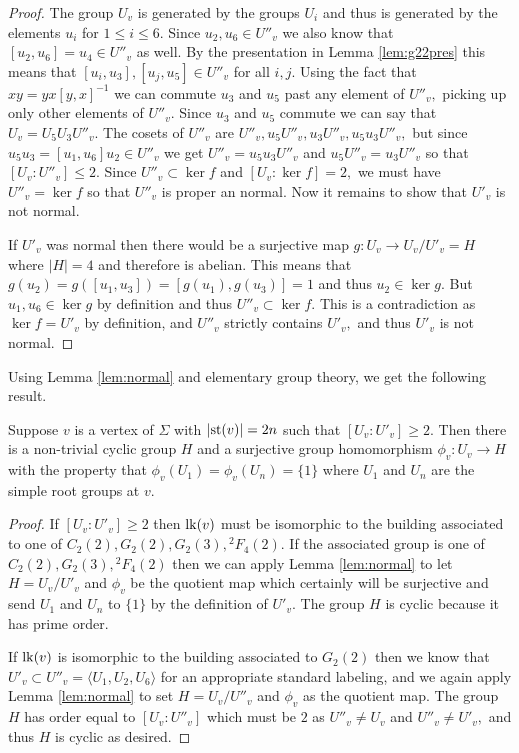 \documentclass[class=book, crop=false,12 pt]{standalone}
\begin{document}
\begin{proof}
	The group $U_v$ is generated by the groups $U_i$ and thus is generated by the elements $u_i$ for $1\le i \le 6.$ Since $u_2,u_6\in U''_v$ we also know that $[u_2,u_6]=u_4\in U''_v$ as well. By the presentation in Lemma \ref{lem:g22pres} this means that $[u_i,u_3],[u_j,u_5]\in U''_v$ for all $i,j.$ Using the fact that $xy=yx[y,x]^{-1}$ we can commute $u_3$ and $u_5$ past any element of $U''_v,$ picking up only other elements of $U''_v.$ Since $u_3$ and $u_5$ commute we can say that $U_v=U_5U_3U''_v.$ The cosets of $U''_v$ are $U''_v,u_5U''_v,u_3U''_v,u_5u_3U''_v,$ but since $u_5u_3=[u_1,u_6]u_2\in U''_v$ we get $U''_v=u_5u_3U''_v$ and $u_5U''_v=u_3U''_v$ so that $[U_v:U''_v]\le 2.$ Since $U''_v\subset \ker f$ and $[U_v:\ker f]=2,$ we must have $U''_v=\ker f$ so that $U''_v$ is proper an normal. Now it remains to show that $U'_v$ is not normal.

	If $U'_v$ was normal then there would be a surjective map $g:U_v\to U_v/U'_v=H$ where $|H|=4$ and therefore is abelian. This means that $g(u_2)=g([u_1,u_3])=[g(u_1),g(u_3)]=1$ and thus $u_2\in \ker g.$ But $u_1,u_6\in \ker g$ by definition and thus $U''_v\subset \ker f.$ This is a contradiction as $\ker f=U'_v$ by definition, and $U''_v$ strictly contains $U'_v,$ and thus $U'_v$ is not normal.

\end{proof}

Using Lemma \ref{lem:normal} and elementary group theory, we get the following result.
\begin{cor}
	\label{cor:phiv}
	Suppose $v$ is a vertex of $\Sigma$ with $|\mathrm{st}(v)|=2n$ such that $[U_v:U'_v]\ge 2.$ Then there is a non-trivial cyclic group $H$ and a surjective group homomorphism $\phi_v:U_v\to H$ with the property that $\phi_v(U_1)=\phi_v(U_n)=\{1\}$ where $U_1$ and $U_n$ are the simple root groups at $v.$
\end{cor}
\begin{proof}
	If $[U_v:U'_v]\ge 2$ then $\mathrm{lk}(v)$ must be isomorphic to the building associated to one of $C_2(2),G_2(2),G_2(3),{}^2F_4(2).$ If the associated group is one of $C_2(2),G_2(3),{}^2F_4(2)$ then we can apply Lemma \ref{lem:normal} to let $H=U_v/U'_v$ and $\phi_v$ be the quotient map which certainly will be surjective and send $U_1$ and $U_n$ to $\{1\}$ by the definition of $U'_v.$ The group $H$ is cyclic because it has prime order.

	If $\mathrm{lk}(v)$ is isomorphic to the building associated to $G_2(2)$ then we know that $U'_v\subset U''_v=\langle U_1,U_2,U_6\rangle$ for an appropriate standard labeling, and we again apply Lemma \ref{lem:normal} to set $H=U_v/U''_v$ and $\phi_v$ as the quotient map. The group $H$ has order equal to $[U_v:U''_v]$ which must be $2$ as $U''_v\neq U_v$ and $U''_v\neq U'_v,$ and thus $H$ is cyclic as desired.
\end{proof}
\end{document}
